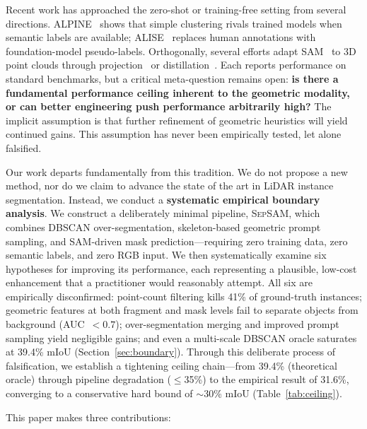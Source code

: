 \documentclass{article}
\begin{document}
Recent work has approached the zero-shot or training-free setting from several
directions. ALPINE~\cite{sautier2025alpine} shows that simple clustering rivals
trained models when semantic labels are available; ALISE~\cite{lyu2025alise}
replaces human annotations with foundation-model pseudo-labels. Orthogonally,
several efforts adapt SAM~\cite{Kirillov_2023_ICCV} to 3D point clouds through
projection~\cite{guo2024sam2point,cen2023segment} or
distillation~\cite{zhou2024pointsam}. Each reports performance on standard
benchmarks, but a critical meta-question remains open: \textbf{is there a
fundamental performance ceiling inherent to the geometric modality, or can better
engineering push performance arbitrarily high?} The implicit assumption is that
further refinement of geometric heuristics will yield continued gains. This
assumption has never been empirically tested, let alone falsified.

Our work departs fundamentally from this tradition. We do not propose a new
method, nor do we claim to advance the state of the art in LiDAR instance
segmentation. Instead, we conduct a \textbf{systematic empirical boundary
analysis}. We construct a deliberately minimal pipeline, \textsc{SepSAM},
which combines DBSCAN over-segmentation, skeleton-based geometric prompt
sampling, and SAM-driven mask prediction---requiring zero training data, zero
semantic labels, and zero RGB input. We then systematically examine six
hypotheses for improving its performance, each representing a plausible,
low-cost enhancement that a practitioner would reasonably attempt. All six are
empirically disconfirmed: point-count filtering kills 41\% of ground-truth
instances; geometric features at both fragment and mask levels fail to separate
objects from background (AUC~$<0.7$); over-segmentation merging and improved
prompt sampling yield negligible gains; and even a multi-scale DBSCAN oracle
saturates at 39.4\% mIoU (Section~\ref{sec:boundary}). Through this deliberate
process of falsification, we establish a tightening ceiling chain---from 39.4\%
(theoretical oracle) through pipeline degradation ($\leq$35\%) to the empirical
result of 31.6\%, converging to a conservative hard bound of $\sim$30\% mIoU
(Table~\ref{tab:ceiling}).

This paper makes three contributions:
\end{document}
